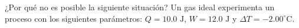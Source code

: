 \item ¿Por qué no es posible la siguiente situación? Un gas ideal experimenta un proceso con los siguientes parámetros: $Q = 10.0\text{ J}$, $W = 12.0\text{ J}$ y $\Delta T = -2.00^\circ\text{C}$.
